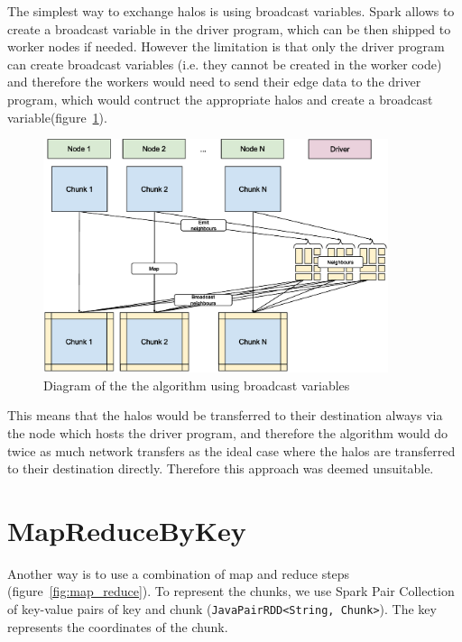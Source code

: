 \documentclass{l4proj}
\begin{document}
The simplest way to exchange halos is using broadcast variables. Spark allows to
create a broadcast variable in the driver program, which can be then shipped to worker
nodes if needed. However the limitation is that only the driver program can create
broadcast variables (i.e. they cannot be created in the worker code) and therefore
the workers would need to send their edge data to the driver program, which would
contruct the appropriate halos and create a broadcast variable(figure~\ref{fig:broadcast}).

\begin{figure}
\centering
\includegraphics[width=0.9\textwidth]{images/Broadcast_variable.eps}
\caption{Diagram of the the algorithm using broadcast variables}
\label{fig:broadcast}
\end{figure}

This means that the halos would be transferred to their destination always via
the node which hosts the driver program, and therefore the algorithm would do 
twice as much network transfers as the ideal case where the halos are transferred
to their destination directly. Therefore this approach was deemed unsuitable. 

\section{MapReduceByKey}

Another way is to use a combination of map and reduce steps (figure~\ref{fig:map_reduce}). To represent the 
chunks, we use Spark Pair Collection of key-value pairs of key and chunk (\texttt{JavaPairRDD<String, Chunk>}).
The key represents the coordinates of the chunk.
\end{document}
